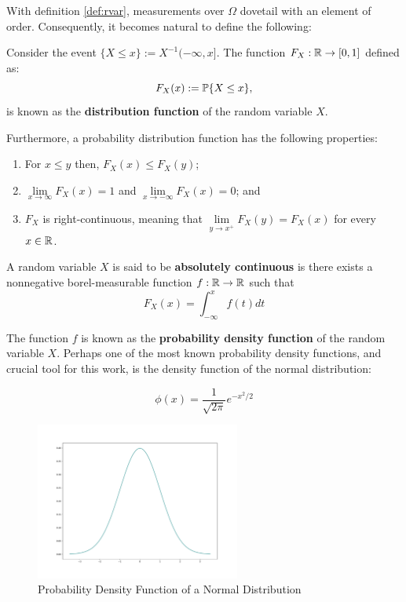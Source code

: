 \documentclass[../TGMAFFIRO.tex]{subfiles}
\begin{document}
With definition \ref{def:rvar}, measurements over $\Omega$ dovetail with an element of order. Consequently, it becomes natural to define the following:

\begin{definition}\label{dist_func}
	Consider the event $\{X \leq x\} := X^{-1}(-\infty, x]$. The function $F_X: \mathbb{R} \rightarrow [0, 1]$ defined as:
	\begin{equation}
		F_X(x) := \mathbb{P}\{X \leq x\},
	\end{equation}
	is known as the \textbf{distribution function} of the random variable $X$.
\end{definition}

Furthermore, a probability distribution function has the following properties:
\begin{enumerate}
	\item For $x \leq y$ then, $F_X(x) \leq F_X(y)$;
	\item $\lim\limits_{x\to\infty} F_X(x) = 1$ and $\lim\limits_{x\to - \infty} F_X(x) = 0$; and
	\item $F_X$ is right-continuous, meaning that $\lim\limits_{y\to x^+} F_X(y) = F_X(x)$ for every $x \in \mathbb{R}$.
\end{enumerate}

\begin{definition}
	A random variable $X$ is said to be \textbf{absolutely continuous} is there exists a nonnegative borel-measurable function $f: \mathbb{R}\rightarrow\mathbb{R}$ such that 
	\begin{equation}
		F_X(x) = \int_{-\infty}^{x} f(t) dt
	\end{equation}
\end{definition}


The function $f$ is known as the \textbf{probability density function} of the random variable $X$. Perhaps one of the most known probability density functions, and crucial tool for this work, is the density function of the normal distribution:

\begin{equation}
	\phi(x) = \frac{1}{\sqrt{2\pi}}e^{-{x^2}/{2}}  
\end{equation}

\begin{figure}[h]
	\centering
	\label{fig:normal_distribution}
	\includegraphics[width=0.6\textwidth]{images/normal_distribution}
	\caption{Probability Density Function of a Normal Distribution}
\end{figure}
\end{document}
